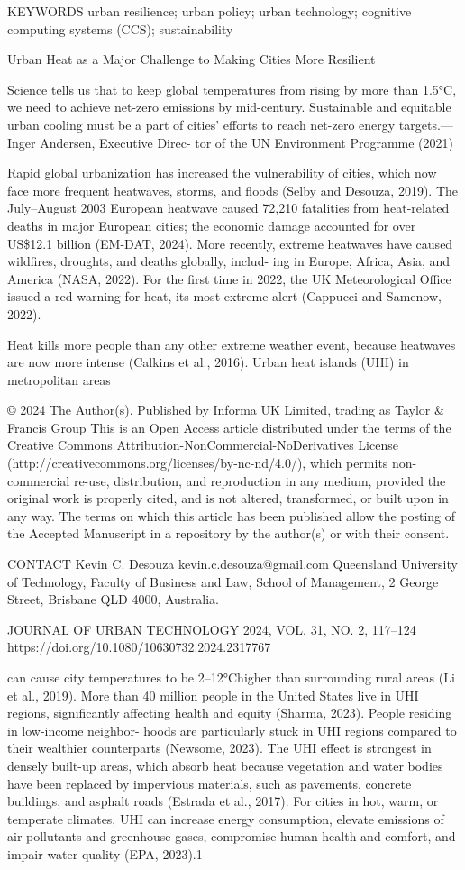 \documentclass[10pt,a4paper]{article}
\begin{document}
KEYWORDS urban resilience; urban policy; urban technology; cognitive computing systems (CCS); sustainability

Urban Heat as a Major Challenge to Making Cities More Resilient

Science tells us that to keep global temperatures from rising by more than 1.5°C, we need to achieve net-zero emissions by mid-century. Sustainable and equitable urban cooling must be a part of cities’ eﬀorts to reach net-zero energy targets.—Inger Andersen, Executive Direc- tor of the UN Environment Programme (2021)

Rapid global urbanization has increased the vulnerability of cities, which now face more frequent heatwaves, storms, and ﬂoods (Selby and Desouza, 2019). The July–August 2003 European heatwave caused 72,210 fatalities from heat-related deaths in major European cities; the economic damage accounted for over US\$12.1 billion (EM-DAT, 2024). More recently, extreme heatwaves have caused wildﬁres, droughts, and deaths globally, includ- ing in Europe, Africa, Asia, and America (NASA, 2022). For the ﬁrst time in 2022, the UK Meteorological Oﬃce issued a red warning for heat, its most extreme alert (Cappucci and Samenow, 2022).

Heat kills more people than any other extreme weather event, because heatwaves are now more intense (Calkins et al., 2016). Urban heat islands (UHI) in metropolitan areas

© 2024 The Author(s). Published by Informa UK Limited, trading as Taylor \& Francis Group This is an Open Access article distributed under the terms of the Creative Commons Attribution-NonCommercial-NoDerivatives License (http://creativecommons.org/licenses/by-nc-nd/4.0/), which permits non-commercial re-use, distribution, and reproduction in any medium, provided the original work is properly cited, and is not altered, transformed, or built upon in any way. The terms on which this article has been published allow the posting of the Accepted Manuscript in a repository by the author(s) or with their consent.

CONTACT Kevin C. Desouza kevin.c.desouza@gmail.com Queensland University of Technology, Faculty of Business and Law, School of Management, 2 George Street, Brisbane QLD 4000, Australia.

JOURNAL OF URBAN TECHNOLOGY 2024, VOL. 31, NO. 2, 117–124 https://doi.org/10.1080/10630732.2024.2317767

can cause city temperatures to be 2–12°Chigher than surrounding rural areas (Li et al., 2019). More than 40 million people in the United States live in UHI regions, signiﬁcantly aﬀecting health and equity (Sharma, 2023). People residing in low-income neighbor- hoods are particularly stuck in UHI regions compared to their wealthier counterparts (Newsome, 2023). The UHI eﬀect is strongest in densely built-up areas, which absorb heat because vegetation and water bodies have been replaced by impervious materials, such as pavements, concrete buildings, and asphalt roads (Estrada et al., 2017). For cities in hot, warm, or temperate climates, UHI can increase energy consumption, elevate emissions of air pollutants and greenhouse gases, compromise human health and comfort, and impair water quality (EPA, 2023).1
\end{document}
